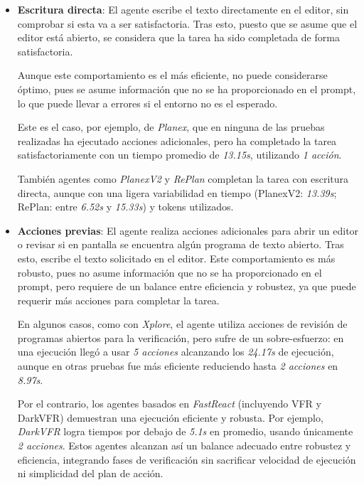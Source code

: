 \begin{itemize}
    \item \textbf{Escritura directa}: El agente escribe el texto directamente
    en el editor, sin comprobar si esta va a ser satisfactoria. Tras esto, 
    puesto que se asume que el editor está abierto, se considera que la tarea
    ha sido completada de forma satisfactoria.

    Aunque este comportamiento es el más eficiente, no puede considerarse
    óptimo, pues se asume información que no se ha proporcionado en el prompt,
    lo que puede llevar a errores si el entorno no es el esperado.

    Este es el caso, por ejemplo, de \emph{Planex}, que en ninguna de las
    pruebas realizadas ha ejecutado acciones adicionales, pero ha completado
    la tarea satisfactoriamente con un tiempo promedio de \emph{13.15s},
    utilizando \emph{1 acción}.

    También agentes como \emph{PlanexV2} y \emph{RePlan} completan la
    tarea con escritura directa, aunque con una ligera variabilidad en tiempo
    (PlanexV2: \emph{13.39s}; RePlan: entre \emph{6.52s} y \emph{15.33s})
    y tokens utilizados.


    \item \textbf{Acciones previas}: El agente realiza acciones adicionales
    para abrir un editor o revisar si en pantalla se encuentra algún programa
    de texto abierto. Tras esto, escribe el texto solicitado
    en el editor. Este comportamiento es más robusto, pues no asume
    información que no se ha proporcionado en el prompt, pero requiere de un
    balance entre eficiencia y robustez, ya que puede requerir más acciones
    para completar la tarea.

    En algunos casos, como con \emph{Xplore}, el agente utiliza acciones de revisión
    de programas abiertos para la verificación, pero sufre de un sobre-esfuerzo:
    en una ejecución llegó a usar \emph{5 acciones} alcanzando los \emph{24.17s} 
    de ejecución, aunque en otras pruebas fue más eficiente reduciendo hasta \emph{2 acciones}
    en \emph{8.97s}.

    Por el contrario, los agentes basados en \emph{FastReact} (incluyendo VFR y DarkVFR)
    demuestran una ejecución eficiente y robusta. Por ejemplo, \emph{DarkVFR}
    logra tiempos por debajo de \emph{5.1s} en promedio, usando únicamente 
    \emph{2 acciones}. Estos agentes alcanzan así un balance adecuado entre 
    robustez y eficiencia, integrando fases de verificación sin sacrificar 
    velocidad de ejecución ni simplicidad del plan de acción.
  
\end{itemize}

